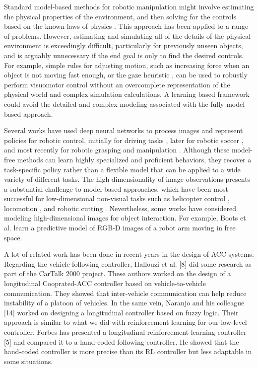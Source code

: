 Standard model-based methods for robotic manipulation might involve estimating the physical properties of the environment, and then solving for the controls based on the known laws of physics \cite{OK-Robot-1987} \cite{Predictive2014} \cite{PlanningFramework2012}. This approach has been applied to a range of problems. However, estimating and simulating all of the details of the physical environment is exceedingly difficult, particularly for previously unseen objects, and is arguably unnecessary if the end goal is only to find the desired controls. For example, simple rules for adjusting motion, such as increasing force when an object is not moving fast enough, or the gaze heuristic \cite{FieldersNature2003}, can be used to robustly perform visuomotor control without an overcomplete representation of the physical world and complex simulation calculations. A learning based framework could avoid the detailed and complex modeling associated with the fully model-based approach.

Several works have used deep neural networks to process images and represent policies for robotic control, initially for driving tasks \cite{AutonomousLand1989} \cite{LongrangeVision2009}, later for robotic soccer \cite{RobotSoccer2009}, and most recently for robotic grasping \cite{Grasp2016} \cite{RooticGrasping2016} and manipulation \cite{Visuomotor2016}. Although these model-free methods can learn highly specialized and proficient behaviors, they recover a task-specific policy rather than a flexible model that can be applied to a wide variety of different tasks. The high dimensionality of image observations presents a substantial challenge to model-based approaches, which have been most successful for low-dimensional non-visual tasks \cite{PolicySearch2011} such as helicopter control \cite{HeliNg2007}, locomotion \cite{Trajectory2012}, and robotic cutting \cite{Deepmpc2015}. Nevertheless, some works have considered modeling high-dimensional images for object interaction. For example, Boots et al. \cite{Predictive2014} learn a predictive model of RGB-D images of a robot arm moving in free space.


A lot of related work has been done in recent years in the design of ACC systems. Regarding the vehicle-following controller, Hallouzi et al. [8] did some research as part of the CarTalk 2000 project. These authors worked on the design of a longitudinal Cooprated-ACC controller based on vehicle-to-vehicle communication. They showed that inter-vehicle communication can help reduce instability of a platoon of vehicles. In the same vein, Naranjo and his colleague [14] worked on designing a longitudinal controller based on fuzzy logic. Their approach is similar to what we did with reinforcement learning for our low-level controller. Forbes has presented a longitudinal reinforcement learning controller [5] and compared it to a hand-coded following controller. He showed that the hand-coded controller is more precise than its RL controller but less adaptable in some situations.

